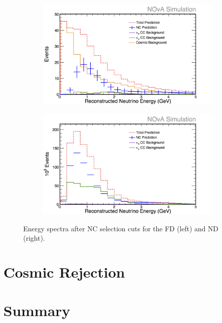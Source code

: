 \begin{figure}[h]
  \centering
  \begin{subfigure}{.48\textwidth}
    \centering
    \includegraphics[width=1\linewidth]{figures/RecoE5FD.png}
  \end{subfigure}
  \begin{subfigure}{.48\textwidth}
    \centering
    \includegraphics[width=1\linewidth]{figures/RecoE5ND.png}
  \end{subfigure}
  \caption[Energy Spectra After NC Selection Cuts]{Energy spectra after NC selection cuts for the FD (left) and ND (right).}
  \label{fig:NP1NCSel}
\end{figure}

\section{Cosmic Rejection}



\section{Summary}

